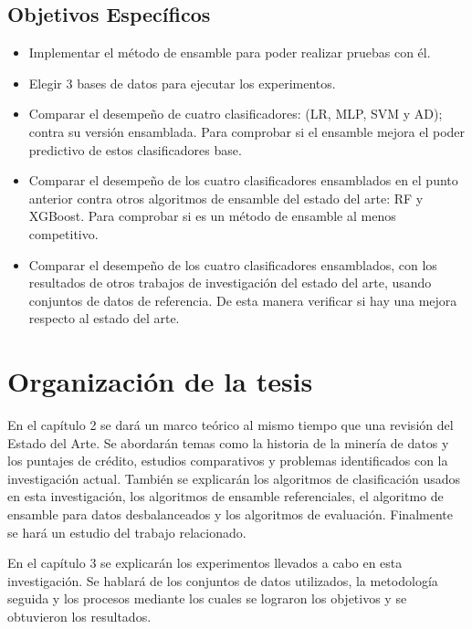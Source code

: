 \subsection{Objetivos Específicos}

\begin{itemize}
	\item Implementar el método de ensamble para poder realizar pruebas con él.

	\item Elegir 3 bases de datos para ejecutar los experimentos.

	\item Comparar el desempeño de cuatro clasificadores: (\ac{LR}, \ac{MLP}, \ac{SVM} y \ac{AD}); contra su versión ensamblada. Para comprobar si el ensamble mejora el poder predictivo de estos clasificadores base.

	\item Comparar el desempeño de los cuatro clasificadores ensamblados en el punto anterior contra otros algoritmos de ensamble del estado del arte: \ac{RF} y \ac{XGBoost}. Para comprobar si es un método de ensamble al menos competitivo.

	\item Comparar el desempeño de los cuatro clasificadores ensamblados, con los resultados de otros trabajos de investigación del estado del arte, usando conjuntos de datos de referencia. De esta manera verificar si hay una mejora respecto al estado del arte.
\end{itemize}

\section{Organización de la tesis}

En el capítulo 2 se dará un marco teórico al mismo tiempo que una revisión del Estado del Arte. Se abordarán temas como la historia de la minería de datos y los puntajes de crédito, estudios comparativos y problemas identificados con la investigación actual. También se explicarán los algoritmos de clasificación usados en esta investigación, los algoritmos de ensamble referenciales, el algoritmo de ensamble para datos desbalanceados y los algoritmos de evaluación. Finalmente se hará un estudio del trabajo relacionado.

En el capítulo 3 se explicarán los experimentos llevados a cabo en esta investigación. Se hablará de los conjuntos de datos utilizados, la metodología seguida y los procesos mediante los cuales se lograron los objetivos y se obtuvieron los resultados.

